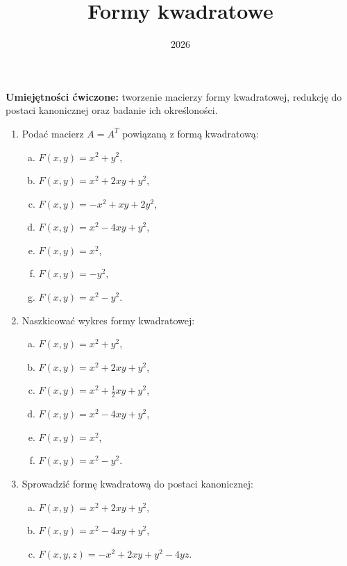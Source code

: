 \documentclass{article}
\title{Formy kwadratowe}
\date{2026}
\begin{document}
\maketitle

\begin{center}
\textbf{Umiejętności ćwiczone:} tworzenie macierzy formy kwadratowej, redukcję do postaci kanonicznej oraz badanie ich określoności.
\end{center}



\begin{enumerate}

\item Podać macierz $A = A^{T}$ powiązaną z formą kwadratową:
    \begin{enumerate}[a)]
        \item $F(x, y) = x^2 + y^2$,
        \item $F(x, y) = x^2 + 2xy + y^2$,
        \item $F(x, y) = -x^2 + xy + 2y^2$,
        \item $F(x, y) = x^2 - 4xy + y^2$,
        \item $F(x, y) = x^2$,
        \item $F(x, y) = -y^2$,
        \item $F(x, y) = x^2 - y^2$.
    \end{enumerate}

\item Naszkicować wykres formy kwadratowej:
    \begin{enumerate}[a)]
        \item $F(x, y) = x^2 + y^2$,
        \item $F(x, y) = x^2 + 2xy + y^2$,
        \item $F(x, y) = x^2 + \frac{1}{2}xy + y^2$,
        \item $F(x, y) = x^2 - 4xy + y^2$,
        \item $F(x, y) = x^2$,
        \item $F(x, y) = x^2 - y^2$.
    \end{enumerate}

\item Sprowadzić formę kwadratową do postaci kanonicznej:
    \begin{enumerate}[a)]
        \item $F(x, y) = x^2 + 2xy + y^2$,
        \item $F(x, y) = x^2 - 4xy + y^2$,
        \item $F(x, y, z) = -x^{2} + 2xy + y^{2} -4yz$.
    \end{enumerate}


\end{enumerate}
\end{document}
